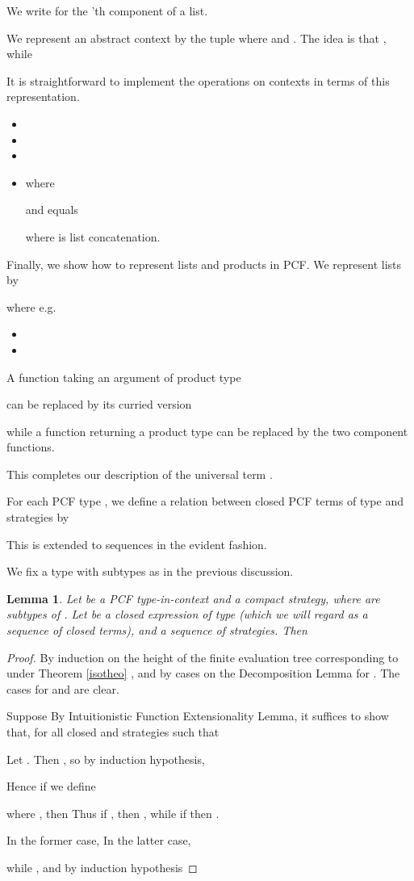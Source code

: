 \documentclass[11pt]{article}
\newtheorem{lemma}[theorem]{Lemma}
\begin{document}
We write  for the 'th component of a list.

We represent an abstract context  by the tuple
 where  and
. The idea is that , while


It is straightforward to implement the operations on contexts in terms of this representation.

\begin{itemize}
\item 
\item 
\item 
\item 

where

and  equals

where  is list concatenation.
\end{itemize}
Finally, we show how to represent lists and products in PCF. We represent
lists by

where e.g.
\begin{itemize}
\item 

\item 
\end{itemize}
A function taking an argument of product type

can be replaced by its curried version

while a function returning a product type can be replaced by the two
component functions.

This completes our description of the universal term .

\newcommand{\R}{{\; \cal R\; }}
For each PCF type , we define a relation  between
closed PCF terms of type  and strategies  by

This is extended to sequences  in
the evident fashion.

We fix a type  with subtypes  as in the previous
discussion.

\begin{lemma}\label{522}
Let  be a PCF type-in-context and
 a compact strategy, where
 are subtypes of . Let  be a closed expression
of type  (which we will regard as a sequence of
closed terms), and  a sequence of strategies.
Then

\end{lemma}

\begin{proof} By induction on the height of the finite evaluation
tree corresponding to  under Theorem \ref{isotheo} , and
by cases on the Decomposition Lemma for . The cases for
 and
 are
clear.

Suppose 
By Intuitionistic Function Extensionality Lemma, it suffices to show
that, for all closed  and
strategies  such that 

Let . Then
,
so by induction hypothesis,

Hence if we define

where , then  Thus if
, then
, while if  then .

In the former case, 
In the latter case,

while , and by induction
hypothesis 
\end{proof}
\end{document}
